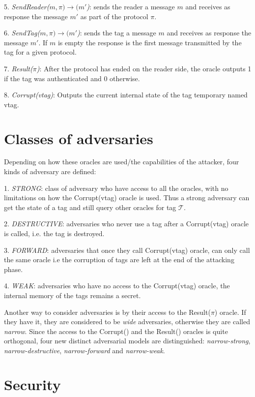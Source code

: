     5. \textit{SendReader($m, \pi) \rightarrow (m'$)}: sends the reader a message $m$ and receives as response 
    the message $m'$ as part of the protocol $\pi$.

    6. \textit{SendTag($m, \pi) \rightarrow (m'$)}: sends the tag a message $m$ and receives as response 
    the message $m'$. If $m$ is empty the response is the first message transmitted by the tag for
    a given protocol. 

    7. \textit{Result($\pi$)}: After the protocol has ended on the reader side, the oracle outputs 1 if the tag was 
    authenticated and 0 otherwise.

    8. \textit{Corrupt(vtag)}: Outputs the current internal state of the tag temporary named vtag. 

\section{Classes of adversaries}
    Depending on how these oracles are used/the capabilities of the attacker, four kinds of adversary are defined:
    
    1. \textit{STRONG}: class of adversary who have access to all the oracles, with no limitations on how the Corrupt(vtag) oracle
    is used. Thus a strong adversary can get the state of a tag and still query other oracles for tag $\mathcal{T}$.

    2. \textit{DESTRUCTIVE}: adversaries who never use a tag after a Corrupt(vtag) oracle is called,
        i.e. the tag is destroyed.

    3. \textit{FORWARD}: adversaries that once they call Corrupt(vtag) oracle, can only call the same oracle
        i.e the corruption of tags are left at the end of the attacking phase.

    4. \textit{WEAK}: adversaries who have no access to the Corrupt(vtag) oracle, the internal memory of the tags remains a secret. 

    Another way to consider adversaries is by their access to the Result($\pi$) oracle. If they have it, they are considered to be
    \textit{wide} adversaries, otherwise they are called \textit{narrow}. Since the access to the Corrupt() and the Result() oracles
    is quite orthogonal, four new distinct adversarial models are distinguished: \textit{narrow-strong}, \textit{narrow-destructive}, 
    \textit{narrow-forward} and \textit{narrow-weak}.

\section{Security}

